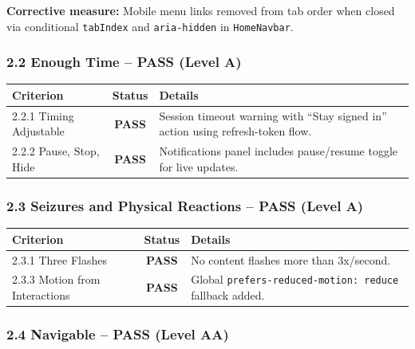 \documentclass[12pt,a4paper]{article}
\newcommand{\pass}{\textcolor{passgreen}{\textbf{PASS}}}
\begin{document}
\noindent\textbf{Corrective measure:} Mobile menu links removed from tab order when closed via conditional \texttt{tabIndex} and \texttt{aria-hidden} in \texttt{HomeNavbar}.

\subsubsection{2.2 Enough Time -- \pass{} (Level A)}

\begin{table}[H]
\centering
\begin{tabularx}{\textwidth}{lcX}
\toprule
\textbf{Criterion} & \textbf{Status} & \textbf{Details} \\
\midrule
2.2.1 Timing Adjustable  & \pass & Session timeout warning with ``Stay signed in'' action using refresh-token flow. \\
2.2.2 Pause, Stop, Hide  & \pass & Notifications panel includes pause/resume toggle for live updates. \\
\bottomrule
\end{tabularx}
\end{table}

\subsubsection{2.3 Seizures and Physical Reactions -- \pass{} (Level A)}

\begin{table}[H]
\centering
\begin{tabularx}{\textwidth}{lcX}
\toprule
\textbf{Criterion} & \textbf{Status} & \textbf{Details} \\
\midrule
2.3.1 Three Flashes            & \pass & No content flashes more than 3x/second. \\
2.3.3 Motion from Interactions & \pass & Global \texttt{prefers-reduced-motion: reduce} fallback added. \\
\bottomrule
\end{tabularx}
\end{table}

\subsubsection{2.4 Navigable -- \pass{} (Level AA)}
\end{document}
